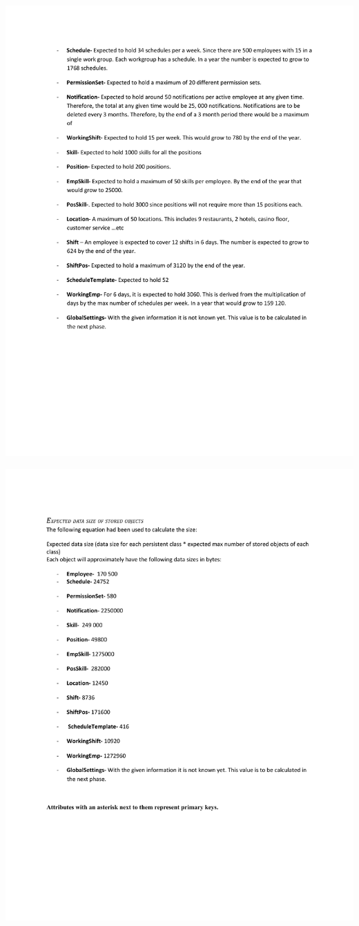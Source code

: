 \documentclass[letterpaper,12pt]{report}
\begin{document}
\newpage
\includegraphics[trim=30mm 10mm 25mm 30mm]{ExternalFiles/DocumentStuff/datasizes6.pdf}

\newpage
\includegraphics[trim=30mm 10mm 25mm 30mm]{ExternalFiles/DocumentStuff/datasizes7.pdf}
\end{document}
